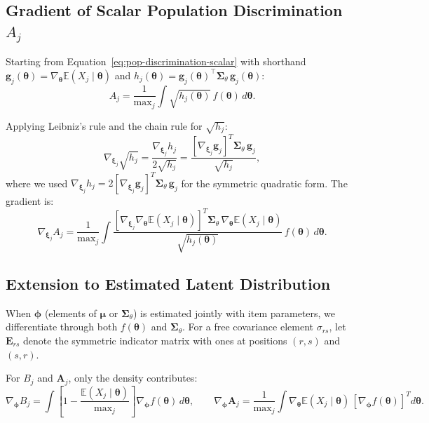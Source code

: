 \documentclass[man, 12pt, floatsintext]{apa7}
\begin{document}
\subsection{Gradient of Scalar Population Discrimination $A_j$}

Starting from Equation~\eqref{eq:pop-discrimination-scalar} with shorthand $\mathbf{g}_j(\boldsymbol{\theta}) = \nabla_{\boldsymbol{\theta}}\mathbb{E}(X_j \mid \boldsymbol{\theta})$ and $h_j(\boldsymbol{\theta}) = \mathbf{g}_j(\boldsymbol{\theta})^\top \boldsymbol{\Sigma}_\theta\, \mathbf{g}_j(\boldsymbol{\theta})$:
$$A_j = \frac{1}{\mathrm{max}_j}\int \sqrt{h_j(\boldsymbol{\theta})}\, f(\boldsymbol{\theta})\, d\boldsymbol{\theta}.$$

Applying Leibniz's rule and the chain rule for $\sqrt{h_j}$:
$$\nabla_{\boldsymbol{\xi}_j} \sqrt{h_j} = \frac{\nabla_{\boldsymbol{\xi}_j} h_j}{2\sqrt{h_j}} = \frac{\left[\nabla_{\boldsymbol{\xi}_j} \mathbf{g}_j\right]^T \boldsymbol{\Sigma}_\theta\, \mathbf{g}_j}{\sqrt{h_j}},$$
where we used $\nabla_{\boldsymbol{\xi}_j} h_j = 2[\nabla_{\boldsymbol{\xi}_j} \mathbf{g}_j]^T \boldsymbol{\Sigma}_\theta\, \mathbf{g}_j$ for the symmetric quadratic form. The gradient is:
\begin{equation}\label{eq:grad-A-general}
\nabla_{\boldsymbol{\xi}_j} A_j = \frac{1}{\mathrm{max}_j}\int \frac{\left[\nabla_{\boldsymbol{\xi}_j}\nabla_{\boldsymbol{\theta}} \mathbb{E}(X_j \mid \boldsymbol{\theta})\right]^T \boldsymbol{\Sigma}_\theta\, \nabla_{\boldsymbol{\theta}}\mathbb{E}(X_j \mid \boldsymbol{\theta})}{\sqrt{h_j(\boldsymbol{\theta})}}\, f(\boldsymbol{\theta})\, d\boldsymbol{\theta}.
\end{equation}

\subsection{Extension to Estimated Latent Distribution}

When $\boldsymbol{\phi}$ (elements of $\boldsymbol{\mu}$ or $\boldsymbol{\Sigma}_\theta$) is estimated jointly with item parameters, we differentiate through both $f(\boldsymbol{\theta})$ and $\boldsymbol{\Sigma}_\theta$. For a free covariance element $\sigma_{rs}$, let $\mathbf{E}_{rs}$ denote the symmetric indicator matrix with ones at positions $(r,s)$ and $(s,r)$.

For $B_j$ and $\mathbf{A}_j$, only the density contributes:
$$\nabla_{\boldsymbol{\phi}} B_j = \int \left[1 - \frac{\mathbb{E}(X_j \mid \boldsymbol{\theta})}{\mathrm{max}_j}\right] \nabla_{\boldsymbol{\phi}} f(\boldsymbol{\theta})\, d\boldsymbol{\theta}, \qquad
\nabla_{\boldsymbol{\phi}} \mathbf{A}_j = \frac{1}{\mathrm{max}_j} \int \nabla_{\boldsymbol{\theta}}\mathbb{E}(X_j \mid \boldsymbol{\theta})\, [\nabla_{\boldsymbol{\phi}} f(\boldsymbol{\theta})]^T d\boldsymbol{\theta}.$$
\end{document}
